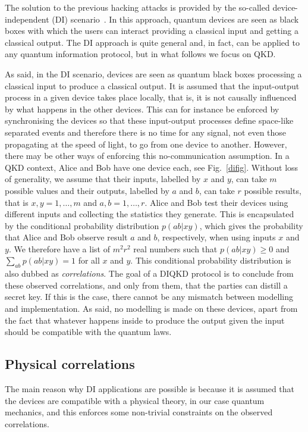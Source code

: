 \documentclass[a4paper]{article}
\begin{document}
The solution to the previous hacking attacks is provided by the so-called device-independent (DI) scenario~\cite{diqkd}. In this approach, quantum devices are seen as black boxes with which the users can interact providing a classical input and getting a classical output. The DI approach is quite general and, in fact, can be applied to any quantum information protocol, but in what follows we focus on QKD. 

As said, in the DI scenario, devices are seen as quantum black boxes processing a classical input to produce a classical output. It is assumed that the input-output process in a given device takes place locally, that is, it is not causally influenced by what happens in the other devices. This can for instance be enforced by synchronising the devices so that these input-output processes define space-like separated events and therefore there is no time for any signal, not even those propagating at the speed of light, to go from one device to another. However, there may be other ways of enforcing this no-communication assumption.  In a QKD context, Alice and Bob have one device each, see Fig.~\ref{difig}. Without loss of generality, we assume that their inputs, labelled by $x$ and $y$, can take $m$ possible values and their outputs, labelled by $a$ and $b$, can take $r$ possible results, that is $x,y=1,\ldots,m$ and $a,b=1,\ldots,r$. Alice and Bob test their devices using different inputs and collecting the statistics they generate. This is encapsulated by the conditional probability distribution $p(ab|xy)$, which gives the probability that Alice and Bob observe result $a$ and $b$, respectively, when using inputs $x$ and $y$. We therefore have a list of $m^2r^2$ real numbers such that $p(ab|xy)\geq 0$ and $\sum_{ab}p(ab|xy)=1$ for all $x$ and $y$. This conditional probability distribution is also dubbed as \emph{correlations}. The goal of a DIQKD protocol is to conclude from these observed correlations, and only from them, that the parties can distill a secret key. If this is the case, there cannot be any mismatch between modelling and implementation. As said, no modelling is made on these devices, apart from the fact that whatever happens inside to produce the output given the input should be compatible with the quantum laws.


\subsection{Physical correlations}

The main reason why DI applications are possible is because it is assumed that the devices are compatible with a physical theory, in our case quantum mechanics, and this enforces some non-trivial constraints on the observed correlations.
\end{document}
